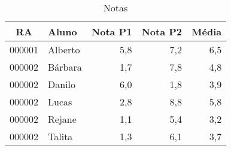 \documentclass{article}
\begin{document}
%

\begin{table}
  \centering
  \caption{Notas}
  \begin{tabular}{|c|l|r|r|r|}
    \hline
    RA     & Aluno                    & Nota P1 & Nota P2 & Média \\ \hline
    000001 & Alberto                  & 5,8     & 7,2     & 6,5 \\
    000002 & Bárbara                  & 1,7     & 7,8     & 4,8 \\
    000002 & Danilo                   & 6,0     & 1,8     & 3,9 \\
    000002 & Lucas                    & 2,8     & 8,8     & 5,8 \\
    000002 & Rejane                   & 1,1     & 5,4     & 3,2 \\
    000002 & Talita                   & 1,3     & 6,1     & 3,7 \\ \hline
  \end{tabular}
\end{table}
\end{document}
